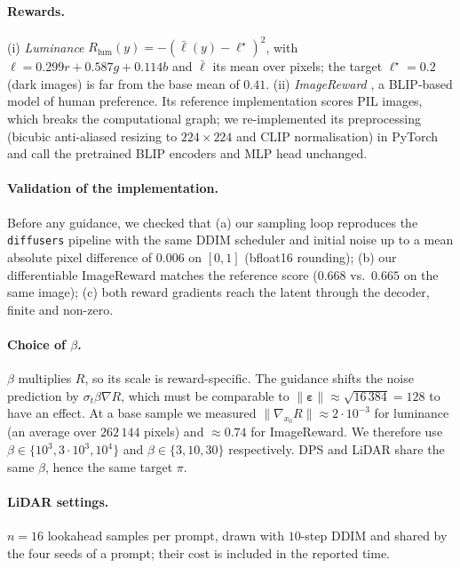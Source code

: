 \documentclass[11pt]{article}
\newcommand{\eps}{\bm{\varepsilon}}
\begin{document}
\paragraph{Rewards.} (i) \emph{Luminance} $R_{\mathrm{lum}}(y) = -(\bar\ell(y)-\ell^\star)^2$, with $\ell = 0.299r + 0.587g + 0.114b$ and $\bar\ell$ its mean over pixels; the target $\ell^\star=0.2$ (dark images) is far from the base mean of $0.41$. (ii) \emph{ImageReward} \citep{xu2023imagereward}, a BLIP-based \citep{li2022blip} model of human preference. Its reference implementation scores PIL images, which breaks the computational graph; we re-implemented its preprocessing (bicubic anti-aliased resizing to $224\times224$ and CLIP normalisation) in PyTorch and call the pretrained BLIP encoders and MLP head unchanged.

\paragraph{Validation of the implementation.} Before any guidance, we checked that (a) our sampling loop reproduces the \texttt{diffusers} pipeline with the same DDIM scheduler and initial noise up to a mean absolute pixel difference of $0.006$ on $[0,1]$ (bfloat16 rounding); (b) our differentiable ImageReward matches the reference score ($0.668$ vs.\ $0.665$ on the same image); (c) both reward gradients reach the latent through the decoder, finite and non-zero.

\paragraph{Choice of $\beta$.} $\beta$ multiplies $R$, so its scale is reward-specific. The guidance shifts the noise prediction by $\sigma_t\beta\nabla R$, which must be comparable to $\|\eps\|\approx\sqrt{16\,384}=128$ to have an effect. At a base sample we measured $\|\nabla_{x_0}R\|\approx2\cdot10^{-3}$ for luminance (an average over $262\,144$ pixels) and $\approx0.74$ for ImageReward. We therefore use $\beta\in\{10^3, 3\cdot10^3, 10^4\}$ and $\beta\in\{3,10,30\}$ respectively. DPS and LiDAR share the same $\beta$, hence the same target $\pi$.

\paragraph{LiDAR settings.} $n=16$ lookahead samples per prompt, drawn with $10$-step DDIM and shared by the four seeds of a prompt; their cost is included in the reported time.
\end{document}
